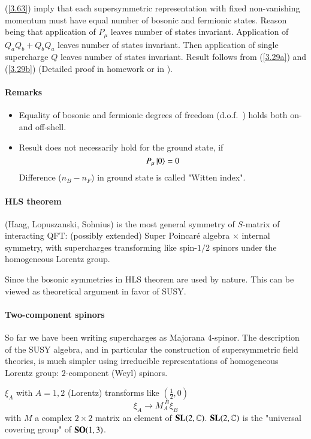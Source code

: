 (\ref{3.63}) imply that each supersymmetric representation with fixed non-vanishing momentum must have equal number of bosonic and fermionic states.
Reason being that application of $P_\mu$ leaves number of states invariant. Application of $Q_a Q_b + Q_b Q_a$ leaves number of states invariant. Then application of single supercharge $Q$ leaves number of states invariant. Result follows from (\ref{3.29a}) and (\ref{3.29b}) (Detailed proof in homework or in \cite{drees_godbole_roy_2008}).

\paragraph{Remarks}
\begin{itemize}
   \item Equality of bosonic and fermionic degrees of freedom (d.o.f.~) holds both on- and off-shell.
   \item Result does not necessarily hold for the ground state, if
      \begin{equation*}
         P_\mu \ket{0} = 0
      \end{equation*}
      Difference ($n_B - n_F$) in ground state is called "Witten index"\cite{Witten:1982df}.
\end{itemize}

\paragraph{HLS theorem}
(Haag, Lopuszanski, Sohnius) is the most general symmetry of $S$-matrix of interacting QFT: (possibly extended) Super Poincaré algebra $\times$ internal symmetry, with supercharges transforming like spin-$1/2$ spinors under the homogeneous Lorentz group.

Since the bosonic symmetries in HLS theorem are used by nature. This can be viewed as theoretical argument in favor of SUSY.

\paragraph{Two-component spinors}
So far we have been writing supercharges as Majorana $4$-spinor. The description of the SUSY algebra, and in particular the construction of supersymmetric field theories, is much simpler using irreducible representations of homogeneous Lorentz group: $2$-component (Weyl) spinors.

$\xi_A$ with $A=1,2$ (Lorentz) transforms like $(\frac{1}{2},0)$
\begin{equation}
   \xi_A \rightarrow M_A^{\ B} \xi_B \label{3.64}
\end{equation}
with $M$ a complex $2 \times 2$ matrix an element of $\mathbf{SL}(2,\mathbb{C})$. $\mathbf{SL}(2,\mathbb{C})$ is the "universal covering group" of $\mathbf{SO}(1,3)$.

